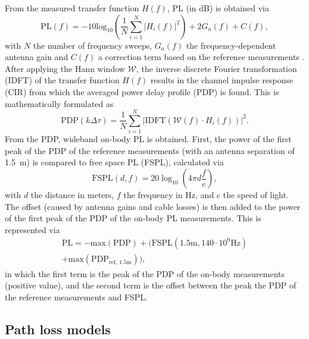 \documentclass[preprint]{rsl}
\begin{document}
From the measured transfer function $H(f)$, PL (in dB) is obtained via
\begin{equation}
\label{eq:PL}
\text{PL}(f)= -10 \text{log}_{10} \left( \frac{1}{N} \sum_{i=1}^N | H_i(f) |^2 \right) + 2 G_a(f) + C(f), 
\end{equation}
with $N$ the number of frequency sweeps, $G_a(f)$ the frequency-dependent antenna gain and $C(f)$ a correction term based on the reference measurements \cite{DeBeelde2021_eucap}.
After applying the Hann window $\mathcal{W}$, the inverse discrete Fourier transformation (IDFT) of the transfer function $H(f)$ results in the channel impulse response (CIR) from which the averaged power delay profile (PDP) is found. 
This is mathematically formulated as
\begin{equation}
\text{PDP}(k\Delta\tau) = \frac{1}{N} \sum_{i=1}^N | \text{IDFT}(\mathcal{W}(f) \cdot H_i(f)) |^2.
\label{eq:PDP}
\end{equation}
From the PDP, wideband on-body PL is obtained. 
First, the power of the first peak of the PDP of the reference measurements (with an antenna separation of 1.5~m) is compared to free space PL (FSPL), calculated via 
\begin{equation}
\text{FSPL}(d,f)= 20 \log_{10} \left( 4 \pi d \frac{f}{\text{c}}\right), 
\label{eq:FSPL}
\end{equation}
with $d$ the distance in meters, $f$ the frequency in Hz, and c the speed of light. 
The offset (caused by antenna gains and cable losses) is then added to the power of the first peak of the PDP of the on-body PL measurements. 
This is represented via
\begin{multline}
\text{PL} = - \text{max}(\text{PDP})  + (\text{FSPL}(1.5 \text{m}, 140\cdot10^9 \text{Hz}) \\ + \text{max}(\text{PDP}_\text{ref, 1.5m}) ),
\label{eq:WB-PL}
\end{multline}
in which the first term is the peak of the PDP of the on-body measurements (positive value), and the second term is the offset between the peak the PDP of the reference measurements and FSPL.

\subsection{Path loss models}
\end{document}
